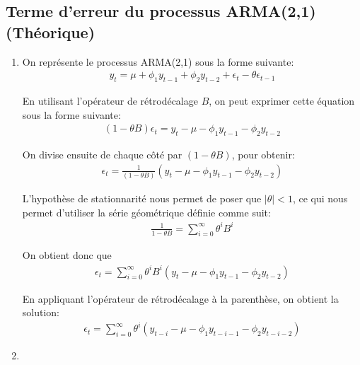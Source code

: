 \documentclass{article}
\begin{document}
\subsection{Terme d'erreur du processus ARMA(2,1) (Théorique)}

\begin{enumerate}
\item
  On représente le processus ARMA(2,1) sous la forme suivante:
  \begin{align*}
    y_t = \mu + \phi_1 y_{t-1} + \phi_2 y_{t-2} + \epsilon_t - \theta\epsilon_{t-1}
  \end{align*}
  
  En utilisant l'opérateur de rétrodécalage $B$, on peut exprimer cette équation sous la forme suivante:
  \begin{align*}
    (1-\theta B)\epsilon_t = y_t - \mu - \phi_1 y_{t-1} - \phi_2 y_{t-2}
  \end{align*}
  
  On divise ensuite de chaque côté par $(1-\theta B)$, pour obtenir:
  \begin{align*}
    \epsilon_t = \frac{1}{(1-\theta B)} \left(y_t - \mu - \phi_1 y_{t-1} - \phi_2 y_{t-2}\right)
  \end{align*}
  
  L'hypothèse de stationnarité nous permet de poser que $| \theta | < 1$, ce qui nous permet d'utiliser la série géométrique définie comme suit:
  \begin{align*}
    \frac{1}{1-\theta B} = \sum_{i=0}^{\infty} \theta^i B^i
  \end{align*}
  
  On obtient donc que 
  \begin{align*}
    \epsilon_t = \sum_{i=0}^{\infty} \theta^i B^i \left(y_t - \mu - \phi_1 y_{t-1} - \phi_2 y_{t-2}\right)
  \end{align*}
  
  En appliquant l'opérateur de rétrodécalage à la parenthèse, on obtient la solution:
  \begin{align*}
    \epsilon_t = \sum_{i=0}^{\infty} \theta^i \left(y_{t-i} - \mu - \phi_1 y_{t-i-1} - \phi_2 y_{t-i-2} \right)
  \end{align*}

\item
  

\end{enumerate}
\end{document}
